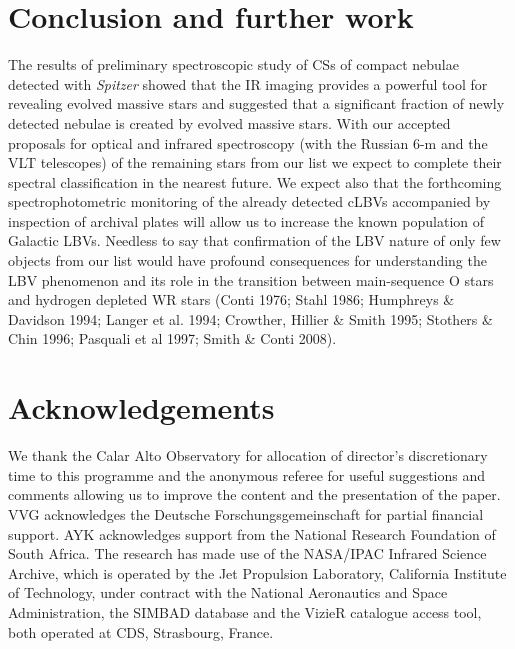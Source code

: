 \documentclass[useAMS]{mn2e}
\begin{document}
\section{Conclusion and further work}

The results of preliminary spectroscopic study of CSs of compact
nebulae detected with {\it Spitzer} showed that the IR imaging
provides a powerful tool for revealing evolved massive stars and
suggested that a significant fraction of newly detected nebulae is
created by evolved massive stars. With our accepted proposals for
optical and infrared spectroscopy (with the Russian 6-m and the VLT
telescopes) of the remaining stars from our list we expect to
complete their spectral classification in the nearest future. We
expect also that the forthcoming spectrophotometric monitoring of
the already detected cLBVs accompanied by inspection of archival
plates will allow us to increase the known population of Galactic
LBVs. Needless to say that confirmation of the LBV nature of only
few objects from our list would have profound consequences for
understanding the LBV phenomenon and its role in the transition
between main-sequence O stars and hydrogen depleted WR stars (Conti
1976; Stahl 1986; Humphreys \& Davidson 1994; Langer et al. 1994;
Crowther, Hillier \& Smith 1995; Stothers \& Chin 1996; Pasquali et
al 1997; Smith \& Conti 2008).

\section{Acknowledgements}
We thank the Calar Alto Observatory for allocation of director's
discretionary time to this programme and the anonymous referee for
useful suggestions and comments allowing us to improve the content
and the presentation of the paper. VVG acknowledges the Deutsche
Forschungsgemeinschaft for partial financial support. AYK
acknowledges support from the National Research Foundation of
South Africa. The research has made use of the NASA/IPAC Infrared
Science Archive, which is operated by the Jet Propulsion
Laboratory, California Institute of Technology, under contract
with the National Aeronautics and Space Administration, the SIMBAD
database and the VizieR catalogue access tool, both operated at
CDS, Strasbourg, France.
\end{document}
